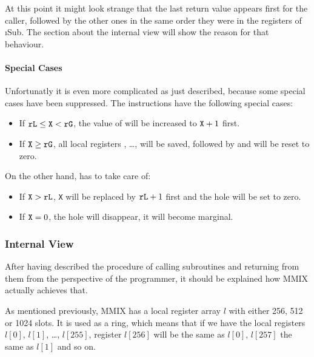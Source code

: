 At this point it might look strange that the last return value appears first for the caller, followed by the other ones in the same order they were in the registers of \i{Sub}. The section about the internal view will show the reason for that behaviour.

\paragraph{Special Cases}

Unfortunatly it is even more complicated as just described, because some special cases have been suppressed. The instructions  have the following special cases:
\begin{itemize}
	\item If ${\tt rL} \le {\tt X} < {\tt rG}$, the value of  will be increased to ${\tt X} + 1$ first.
	\item If ${\tt X} \ge {\tt rG}$, all local registers , \dots,  will be saved, followed by  and  will be reset to zero.
\end{itemize}
On the other hand,  has to take care of:
\begin{itemize}
	\item If ${\tt X} > {\tt rL}$, {\tt X} will be replaced by ${\tt rL} + 1$ first and the hole will be set to zero.
	\item If ${\tt X} = 0$, the hole will disappear, \ie it will become marginal.
\end{itemize}
\citep[pg. 22,23]{mmix-doc}

\subsubsection{Internal View}

After having described the procedure of calling subroutines and returning from them from the perspective of the programmer, it should be explained how MMIX actually achieves that.

As mentioned previously, MMIX has a local register array $l$ with either 256, 512 or 1024 slots. It is used as a ring, which means that if we have the local registers $l[0]$, $l[1]$, \dots, $l[255]$, register $l[256]$ will be the same as $l[0]$, $l[257]$ the same as $l[1]$ and so on.



